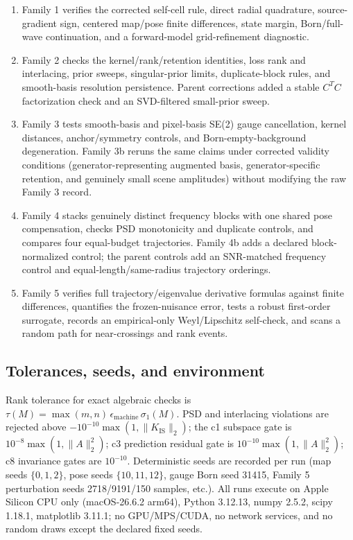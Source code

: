 \documentclass[12pt]{article}
\begin{document}
\begin{enumerate}
\item Family 1 verifies the corrected self-cell rule, direct radial
quadrature, source-gradient sign, centered map/pose finite differences, state
margin, Born/full-wave continuation, and a forward-model grid-refinement
diagnostic.
\item Family 2 checks the kernel/rank/retention identities, loss rank and
interlacing, prior sweeps, singular-prior limits, duplicate-block rules, and
smooth-basis resolution persistence. Parent corrections added a stable
$C^TC$ factorization check and an SVD-filtered small-prior sweep.
\item Family 3 tests smooth-basis and pixel-basis SE(2) gauge cancellation,
kernel distances, anchor/symmetry controls, and Born-empty-background
degeneration. Family 3b reruns the same claims under corrected validity
conditions (generator-representing augmented basis, generator-specific
retention, and genuinely small scene amplitudes) without modifying the raw
Family 3 record.
\item Family 4 stacks genuinely distinct frequency blocks with one shared
pose compensation, checks PSD monotonicity and duplicate controls, and
compares four equal-budget trajectories. Family 4b adds a declared
block-normalized control; the parent controls add an SNR-matched frequency
control and equal-length/same-radius trajectory orderings.
\item Family 5 verifies full trajectory/eigenvalue derivative formulas against
finite differences, quantifies the frozen-nuisance error, tests a robust
first-order surrogate, records an empirical-only Weyl/Lipschitz self-check,
and scans a random path for near-crossings and rank events.
\end{enumerate}

\subsection{Tolerances, seeds, and environment}

Rank tolerance for exact algebraic checks is
$\tau(M)=\max(m,n)\,\epsilon_{\mathrm{machine}}\,\sigma_1(M)$. PSD and
interlacing violations are rejected above
$-10^{-10}\max(1,\|K_{\mathrm{IS}}\|_2)$; the c1 subspace gate is
$10^{-8}\max(1,\|A\|_2^2)$; c3 prediction residual gate is
$10^{-10}\max(1,\|A\|_2^2)$; c8 invariance gates are $10^{-10}$. Deterministic
seeds are recorded per run (map seeds $\{0,1,2\}$, pose seeds
$\{10,11,12\}$, gauge Born seed 31415, Family 5 perturbation seeds
2718/9191/150 samples, etc.). All runs execute on Apple Silicon CPU only
(macOS-26.6.2 arm64), Python 3.12.13, numpy 2.5.2, scipy 1.18.1, matplotlib
3.11.1; no GPU/MPS/CUDA, no network services, and no random draws except the
declared fixed seeds.
\end{document}
